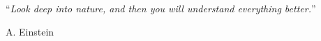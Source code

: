 
\vspace*{0.2\textheight}

\noindent\enquote{\itshape Look deep into nature, and then you will understand everything better.}\bigbreak

\hfill A. Einstein